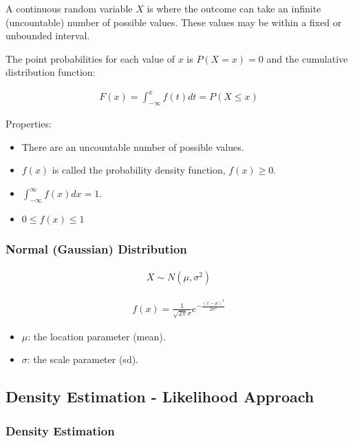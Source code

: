 \indent

A continuous random variable $X$ is where the outcome can take an infinite (uncountable) number of possible values. These values may be within a fixed or unbounded interval.

The point probabilities for each value of $x$ is $P(X=x)=0$ and the cumulative distribution function:

\begin{align*}
    F(x)=\int_{-\infty}^{x} f(t)dt = P(X\leq x)
\end{align*}

Properties:

\begin{itemize}
    \item There are an uncountable number of possible values.
    \item $f(x)$ is called the probability density function, $f(x)\geq 0$.
    \item $\int_{-\infty}^{\infty}f(x)dx = 1$.
    \item $0\leq f(x)\leq 1$
\end{itemize}

\subsubsection{Normal (Gaussian) Distribution}

\begin{align*}
    X\sim N(\mu,\sigma ^2)
\end{align*}

\begin{align*}
    f(x) = \frac{1}{\sqrt{2\pi}\sigma}e^{-\frac{(x-\mu)^2}{2\sigma^2}}
\end{align*}

\begin{itemize}
    \item $\mu$: the location parameter (mean).
    \item $\sigma$: the scale parameter (sd).
\end{itemize}

\subsection{Density Estimation - Likelihood Approach}

\subsubsection{Density Estimation}

